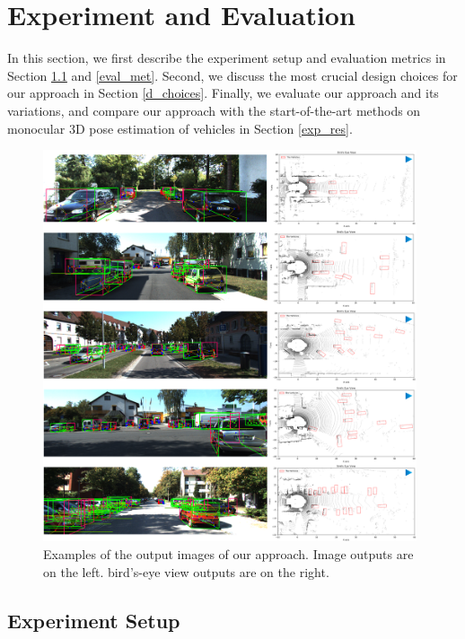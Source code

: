 \documentclass[a4paper,12pt]{article}
\begin{document}
\clearpage

\section{Experiment and Evaluation}
\label{exp_eva}
In this section, we first describe the experiment setup and evaluation metrics in Section \ref{setup} and \ref{eval_met}. Second, we discuss the most crucial design choices for our approach in Section \ref{d_choices}. Finally, we evaluate our approach and its variations, and compare our approach with the start-of-the-art methods on monocular 3D pose estimation of vehicles in Section \ref{exp_res}.

\begin{figure}[H]		
	\includegraphics[width=0.98\textwidth]{res_img2.png}
	\caption[Examples of the output images of our approach.]{Examples of the output images of our approach. Image outputs are on the left. bird's-eye view outputs are on the right.}
	\centering
	\label{figure:res_img}
\end{figure}

\subsection{Experiment Setup}
\label{setup}
\end{document}
